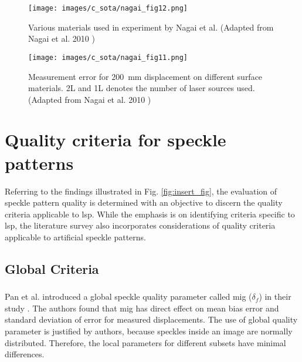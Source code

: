     \begin{figure}[h]
        \centering
        \texttt{[image: images/c\_sota/nagai\_fig12.png]}
        \caption{Various materials used in experiment by Nagai et al. (Adapted from Nagai et al. 2010 \cite{nagai})}
        \label{fig:nagai_fig12}
    \end{figure}

    \begin{figure}[h]
        \centering
        \texttt{[image: images/c\_sota/nagai\_fig11.png]}
        \caption{Measurement error for \SI{200}{\milli\meter} displacement on different surface materials. 2L and 1L denotes the number of laser sources used. (Adapted from Nagai et al. 2010 \cite{nagai})}
        \label{fig:nagai_fig11}
    \end{figure}

    
\section{Quality criteria for speckle patterns} \label{section:quality_lsp}

Referring to the findings illustrated in Fig. \ref{fig:insert_fig}, the evaluation of speckle pattern quality is determined with an objective to discern the quality criteria applicable to \gls{lsp}. While the emphasis is on identifying criteria specific to \gls{lsp}, the literature survey also incorporates considerations of quality criteria applicable to artificial speckle patterns.

    \subsection{Global Criteria}
    
    \subsubsection{}\label{subsubsection:mig}

        Pan et al. introduced a global speckle quality parameter called \gls{mig} ($\delta_f$) in their study \cite{pan_mig}. The authors found that \gls{mig} has direct effect on mean bias error and standard deviation of error for measured displacements. The use of global quality parameter is justified by authors, because speckles inside an image are normally distributed. Therefore, the local parameters for different subsets have minimal differences.

